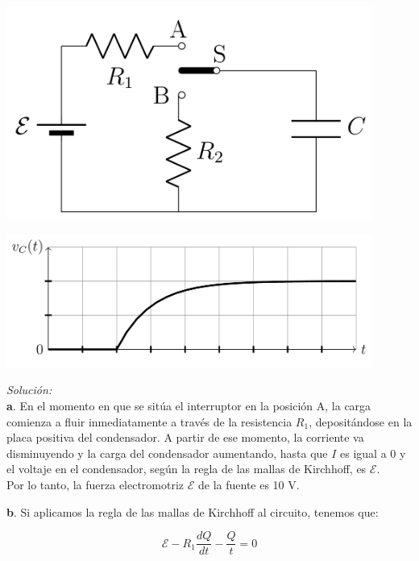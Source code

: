 \begin{center}
    \includegraphics[width=12cm]{files/img3}
\end{center}
\begin{center}
    \includegraphics[width=12cm]{files/img4}
\end{center}

\vspace{20px}
\textit{Solución:}
\\

\textbf{a}. En el momento en que se sitúa el interruptor en la posición A, la carga comienza a fluir inmediatamente a través de la
resistencia $R_1$, depositándose en la placa positiva del condensador. A partir de ese momento, la corriente va disminuyendo y la
carga del condensador aumentando, hasta que $I$ es igual a 0 y el voltaje en el condensador, según la regla de las mallas de Kirchhoff,
es $\mathcal{E}$.\\

Por lo tanto, la fuerza electromotriz $\mathcal{E}$  de la fuente es 10 V.

\vspace{20px}
\textbf{b}. Si aplicamos la regla de las mallas de Kirchhoff al circuito, tenemos que:

\begin{equation*}
    \mathcal{E} - R_1 \frac{dQ}{dt} - \frac{Q}{t} = 0
\end{equation*}

